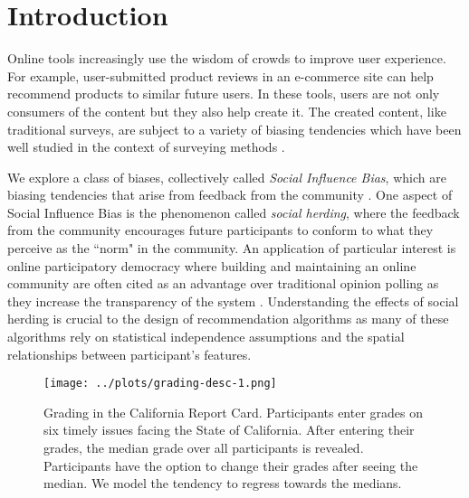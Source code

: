 \section{Introduction}
Online tools increasingly use the wisdom of crowds to improve user experience.
For example, user-submitted product reviews in an e-commerce site can help recommend products to similar future users.
In these tools, users are not only consumers of the content but they also help create it.
The created content, like traditional surveys, are subject to a variety of biasing tendencies which have been well studied in the context of surveying methods \cite{groves2013survey}.

We explore a class of biases, collectively called \emph{Social Influence Bias}, which are biasing tendencies that arise from feedback from the community \cite{demarzo2003persuasion, moscovici1972social, wood2000attitude}.
One aspect of Social Influence Bias is the phenomenon called \emph{social herding}, where the feedback from the community encourages future participants to conform to what they perceive as the ``norm" in the community.
An application of particular interest is online participatory democracy where building and maintaining an online community are often cited as an advantage over traditional opinion polling as they increase the transparency of the system \cite{albors2008new,o2012transparency,noveck2008wiki}.
Understanding the effects of social herding is crucial to the design of recommendation algorithms as many of these algorithms rely on statistical independence assumptions and the spatial relationships between participant's features.

\begin{figure}[h]
  \centering
    \texttt{[image: ../plots/grading-desc-1.png]}
      \caption{Grading in the California Report Card. Participants enter grades on six timely issues facing the State of California. After entering their grades, the median grade over all participants is revealed. Participants have the option to change their grades after seeing the median. We model the tendency to regress towards the medians.}
      \label{grading-1}
\end{figure}

